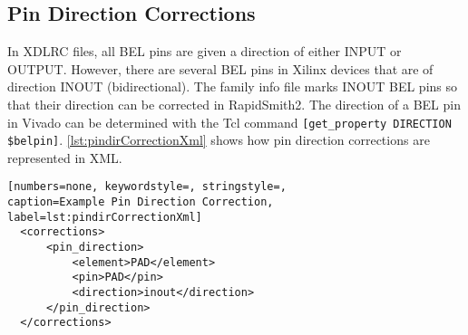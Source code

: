 \subsection{Pin Direction Corrections}
In XDLRC files, all BEL pins are given a direction of either INPUT or OUTPUT.
However, there are several BEL pins in Xilinx devices that are of direction
INOUT (bidirectional). The family info file marks INOUT BEL pins so that their
direction can be corrected in RapidSmith2. The direction of a BEL pin in
Vivado can be determined with the Tcl command \texttt{[get\_property DIRECTION
\$belpin]}. \autoref{lst:pindirCorrectionXml} shows how pin direction
corrections are represented in XML.

\begin{lstlisting}[numbers=none, keywordstyle=, stringstyle=,
caption=Example Pin Direction Correction, label=lst:pindirCorrectionXml]
  <corrections>
      <pin_direction>
          <element>PAD</element>
          <pin>PAD</pin>
          <direction>inout</direction>
      </pin_direction>
  </corrections>
\end{lstlisting}